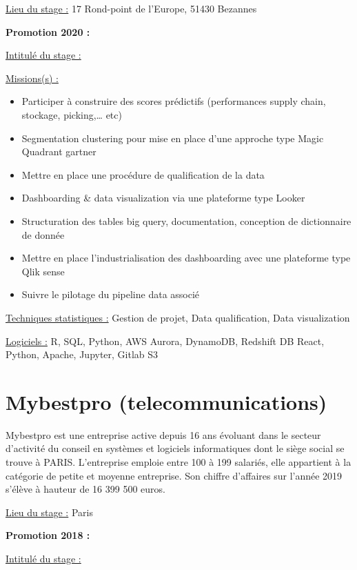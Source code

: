 \documentclass[
  letterpaper,
  DIV=11,
  numbers=noendperiod]{scrreprt}
\begin{document}
\uline{Lieu du stage :} 17 Rond-point de l'Europe, 51430 Bezannes

\textbf{Promotion 2020 :}

\uline{Intitulé du stage :}

\uline{Missions(s) :}

\begin{itemize}
\item
  Participer à construire des scores prédictifs (performances supply
  chain, stockage, picking,\ldots{} etc)
\item
  Segmentation clustering pour mise en place d'une approche type Magic
  Quadrant gartner
\item
  Mettre en place une procédure de qualification de la data
\item
  Dashboarding \& data visualization via une plateforme type Looker
\item
  Structuration des tables big query, documentation, conception de
  dictionnaire de donnée
\item
  Mettre en place l'industrialisation des dashboarding avec une
  plateforme type Qlik sense
\item
  Suivre le pilotage du pipeline data associé
\end{itemize}

\uline{Techniques statistiques :} Gestion de projet, Data qualification,
Data visualization

\uline{Logiciels :} R, SQL, Python, AWS Aurora, DynamoDB, Redshift DB
React, Python, Apache, Jupyter, Gitlab S3

\hypertarget{mybestpro-telecommunications}{%
\section{\texorpdfstring{\textbf{Mybestpro
(telecommunications)}}{Mybestpro (telecommunications)}}\label{mybestpro-telecommunications}}

Mybestpro est une entreprise active depuis 16 ans évoluant dans le
secteur d'activité du conseil en systèmes et logiciels informatiques
dont le siège social se trouve à PARIS. L'entreprise emploie entre 100 à
199 salariés, elle appartient à la catégorie de petite et moyenne
entreprise. Son chiffre d'affaires sur l'année 2019 s'élève à hauteur de
16 399 500 euros.

\uline{Lieu du stage :} Paris

\textbf{Promotion 2018 :}

\uline{Intitulé du stage :}
\end{document}
